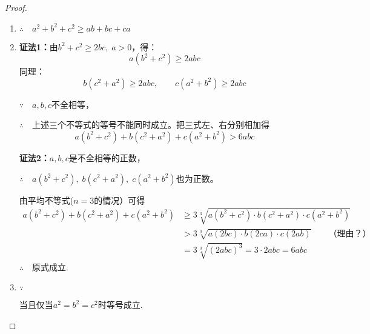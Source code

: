 \begin{proof}
\begin{enumerate}[(1)]
    \item 

    \begin{flushleft}
\end{flushleft}

$\therefore\quad a^2+b^2+c^2\ge ab+bc+ca$

\item \textbf{证法1：}由$b^2+c^2\ge 2bc,\; a>0$，得：
\[a(b^2+c^2)\ge 2abc\]
同理：
\[
    b(c^2+a^2)\ge 2abc, \qquad 
    c(a^2+b^2)\ge 2abc
\]

$\because\quad a,b,c$不全相等，

$\therefore\quad $上述三个不等式的等号不能同时成立。把三式左、右分别相加得
\[a(b^2+c^2)+b(c^2+a^2)+c(a^2+b^2)>6abc\]

\textbf{证法2：}$a,b,c$是不全相等的正数，


$\therefore\quad a(b^2+c^2),\; b(c^2+a^2),\; c(a^2+b^2)$也为正数。

由平均不等式($n=3$的情况）可得
\[    \begin{split}
a(b^2+c^2)+b(c^2+a^2)+c(a^2+b^2)&\ge 3\sqrt[3]{a(b^2+c^2)\cdot b(c^2+a^2)\cdot c(a^2+b^2)}\\
&>3\sqrt[3]{a(2bc)\cdot b(2ca)\cdot c(2ab)}\qquad \text{（理由？）}\\
&=3\sqrt[3]{(2abc)^3}=3\cdot 2abc=6abc
\end{split}\]
$\therefore\quad $原式成立.

\item $\because$
\begin{flushleft}
    \end{flushleft}
当且仅当$a^2=b^2=c^2$时等号成立.


\end{enumerate}
\end{proof}
